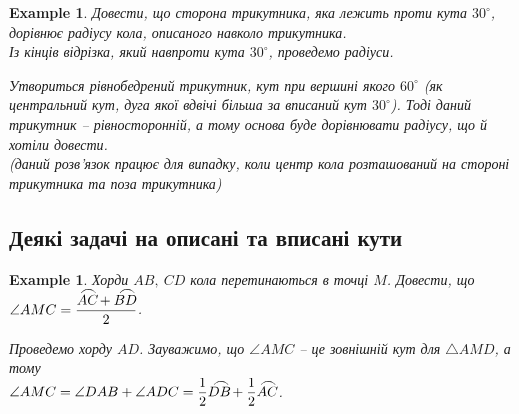 \documentclass[a4paper, 10pt]{article}
\theoremstyle{theoremdd}
\theoremstyle{theoremdd}
\theoremstyle{theoremdd}
\theoremstyle{theoremdd}
\theoremstyle{theoremdd}
\newtheorem{example}[theorem]{Example}
\theoremstyle{theoremdd}
\theoremstyle{theoremdd}
\theoremstyle{theoremdd}
\theoremstyle{theoremdd}
\newcommand{\tarc}{\mbox{\large$\frown$}}
\newcommand{\arc}[2][-3ex]{{#2}{\kern #1{\raisebox{1.5ex}{\tarc}}}}
\begin{document}
\begin{example}
Довести, що сторона трикутника, яка лежить проти кута $30^\circ$, дорівнює радіусу кола, описаного навколо трикутника.
\bigskip \\
Із кінців відрізка, який навпроти кута $30^\circ$, проведемо радіуси.
\begin{figure}[H]
\centering
{}
\end{figure}
Утвориться рівнобедрений трикутник, кут при вершині якого $60^\circ$ (як центральний кут, дуга якої вдвічі більша за вписаний кут $30^\circ$). Тоді даний трикутник -- рівносторонній, а тому основа буде дорівнювати радіусу, що й хотіли довести.\\
(даний розв'язок працює для випадку, коли центр кола розташований на стороні трикутника та поза трикутника)
\end{example}

\subsection{Деякі задачі на описані та вписані кути}
\begin{example}
Хорди $AB,\ CD$ кола перетинаються в точці $M$. Довести, що $\angle AMC = \dfrac{\arc{AC} + \arc{BD}}{2}$.
\begin{figure}[H]
\centering
{}
\end{figure}
Проведемо хорду $AD$. Зауважимо, що $\angle AMC$ -- це зовнішній кут для $\triangle AMD$, а тому\\
$\angle AMC = \angle DAB + \angle ADC = \dfrac{1}{2} \arc{DB} + \dfrac{1}{2} \arc{AC}$.
\end{example}
\end{document}
